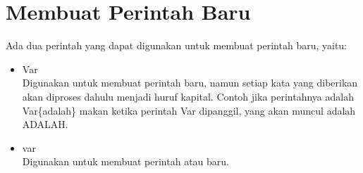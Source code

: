 	\section{Membuat Perintah Baru}
	Ada dua perintah yang dapat digunakan untuk membuat perintah baru, yaitu:
	\begin{itemize}
		\item \bslash Var \\
		      Digunakan untuk membuat perintah baru, namun setiap kata yang diberikan
		      akan diproses dahulu menjadi huruf kapital.
		      Contoh jika perintahnya adalah \bslash Var\{adalah\} makan ketika
		      perintah \bslash Var dipanggil, yang akan muncul adalah ADALAH.
		\item \bslash var \\
		      Digunakan untuk membuat perintah atau baru.
	\end{itemize}
\fi